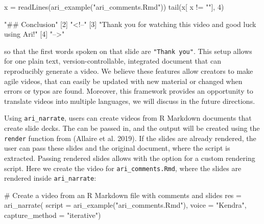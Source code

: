 \begin{Schunk}
\begin{Sinput}
x = readLines(ari_example("ari_comments.Rmd"))
tail(x[ x != ""], 4)
\end{Sinput}
\begin{Soutput}
[1] "## Conclusion"                                             
[2] "<!--"                                                      
[3] "Thank you for watching this video and good luck using Ari!"
[4] "-->"                                                       
\end{Soutput}
\end{Schunk}

so that the first words spoken on that slide are \texttt{"Thank\ you"}.
This setup allows for one plain text, version-controllable, integrated
document that can reproducibly generate a video. We believe these
features allow creators to make agile videos, that can easily be updated
with new material or changed when errors or typos are found. Moreover,
this framework provides an opportunity to translate videos into multiple
languages, we will discuss in the future directions.

Using \texttt{ari\_narrate}, users can create videos from R Markdown
documents that create slide decks. The can be passed in, and the output
will be created using the \texttt{render} function from 
(Allaire et al. 2019). If the slides are already rendered, the user can
pass these slides and the original document, where the script is
extracted. Passing rendered slides allows with the option for a custom
rendering script. Here we create the video for
\texttt{ari\_comments.Rmd}, where the slides are rendered inside
\texttt{ari\_narrate}:

\begin{Schunk}
\begin{Sinput}
# Create a video from an R Markdown file with comments and slides
res = ari_narrate(
  script = ari_example("ari_comments.Rmd"),
  voice = "Kendra",
  capture_method = "iterative")
\end{Sinput}
\end{Schunk}

